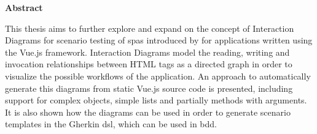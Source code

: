 \thispagestyle{empty}
\begin{center}
    
    \vspace{0.9cm}
    \large{}
    \textbf{Abstract}

\end{center}
\begin{center}
\vspace{0.3cm}
\large{}
\vspace{0.4cm}
This thesis aims to further explore and expand on the concept of Interaction Diagrams for scenario testing of \glspl{spa} introduced by \cite{zhang2019scenario} for applications written using the Vue.js framework. Interaction Diagrams model the reading, writing and invocation relationships between HTML tags as a directed graph in order to visualize the possible workflows of the application. An approach to automatically generate this diagrams from static Vue.js source code is presented, including support for complex objects, simple lists and partially methods with arguments. It is also shown how the diagrams can be used in order to generate scenario templates in the Gherkin \gls{dsl}, which can be used in \gls{bdd}.
\end{center}